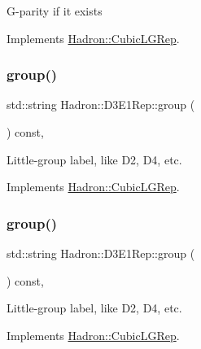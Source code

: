 G-\/parity if it exists 

Implements \mbox{\hyperlink{structHadron_1_1CubicLGRep_ace26f7b2d55e3a668a14cb9026da5231}{Hadron\+::\+Cubic\+L\+G\+Rep}}.

\mbox{\label{structHadron_1_1D3E1Rep_abb8515fbdd1dceea33a5f4af036f31eb}} 
\subsubsection{\texorpdfstring{group()}{group()}\hspace{0.1cm}{\footnotesize\ttfamily [1/3]}}
{\footnotesize\ttfamily std\+::string Hadron\+::\+D3\+E1\+Rep\+::group (\begin{DoxyParamCaption}{ }\end{DoxyParamCaption}) const\hspace{0.3cm}{\ttfamily [inline]}, {\ttfamily [virtual]}}

Little-\/group label, like D2, D4, etc. 

Implements \mbox{\hyperlink{structHadron_1_1CubicLGRep_a9bdb14b519a611d21379ed96a3a9eb41}{Hadron\+::\+Cubic\+L\+G\+Rep}}.

\mbox{\label{structHadron_1_1D3E1Rep_abb8515fbdd1dceea33a5f4af036f31eb}} 
\subsubsection{\texorpdfstring{group()}{group()}\hspace{0.1cm}{\footnotesize\ttfamily [2/3]}}
{\footnotesize\ttfamily std\+::string Hadron\+::\+D3\+E1\+Rep\+::group (\begin{DoxyParamCaption}{ }\end{DoxyParamCaption}) const\hspace{0.3cm}{\ttfamily [inline]}, {\ttfamily [virtual]}}

Little-\/group label, like D2, D4, etc. 

Implements \mbox{\hyperlink{structHadron_1_1CubicLGRep_a9bdb14b519a611d21379ed96a3a9eb41}{Hadron\+::\+Cubic\+L\+G\+Rep}}.

\mbox{\label{structHadron_1_1D3E1Rep_abb8515fbdd1dceea33a5f4af036f31eb}} 
